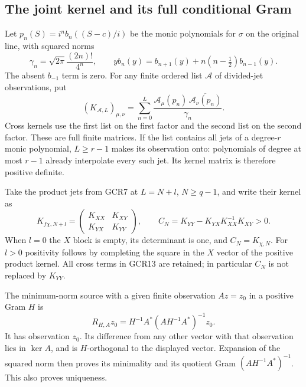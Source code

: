 \subsection{The joint kernel and its full conditional Gram}

Let $p_n(S)=i^n b_n((S-c)/i)$ be the monic polynomials for
$\sigma$ on the original line, with squared norms
\[
 \gamma_n=\sqrt{2\pi}\frac{(2n)!}{4^n},\qquad
 yb_n(y)=b_{n+1}(y)+n(n-\tfrac12)b_{n-1}(y).
\tag{GCR11}
\]
The absent $b_{-1}$ term is zero. For any finite ordered
list $\mathcal A$ of divided-jet observations, put
\[
 (K_{\mathcal A,L})_{\mu,\nu}
 =\sum_{n=0}^L
        \frac{\mathcal A_\mu(p_n)\,
                   \overline{\mathcal A_\nu(p_n)}}{\gamma_n}.
\tag{GCR12}
\]
Cross kernels use the first list on the first factor and the
second list on the second factor. These are full finite matrices.
If the list contains all jets of a degree-$r$ monic polynomial,
$L\geq r-1$ makes its observation onto: polynomials of degree
at most $r-1$ already interpolate every such jet. Its kernel
matrix is therefore positive definite.

Take the product jets from GCR7 at $L=N+l$, $N\geq q-1$,
and write their kernel as
\[
 K_{f\chi,N+l}
   =\begin{pmatrix}K_{XX}&K_{XY}\\K_{YX}&K_{YY}\end{pmatrix},
 \qquad
 C_N=K_{YY}-K_{YX}K_{XX}^{-1}K_{XY}>0.
\tag{GCR13}
\]
When $l=0$ the $X$ block is empty, its determinant is one,
and $C_N=K_{\chi,N}$. For $l>0$ positivity follows by completing
the square in the $X$ vector of the positive product kernel.
All cross terms in GCR13 are retained; in particular $C_N$
is not replaced by $K_{YY}$.

The minimum-norm source with a given finite observation $Az=z_0$
in a positive Gram $H$ is
\[
 R_{H,A}z_0=H^{-1}A^*(AH^{-1}A^*)^{-1}z_0.
\tag{GCR14}
\]
It has observation $z_0$. Its difference from any other vector
with that observation lies in $\ker A$, and is $H$-orthogonal
to the displayed vector. Expansion of the squared norm then
proves its minimality and its quotient Gram
$(AH^{-1}A^*)^{-1}$. This also proves uniqueness.

